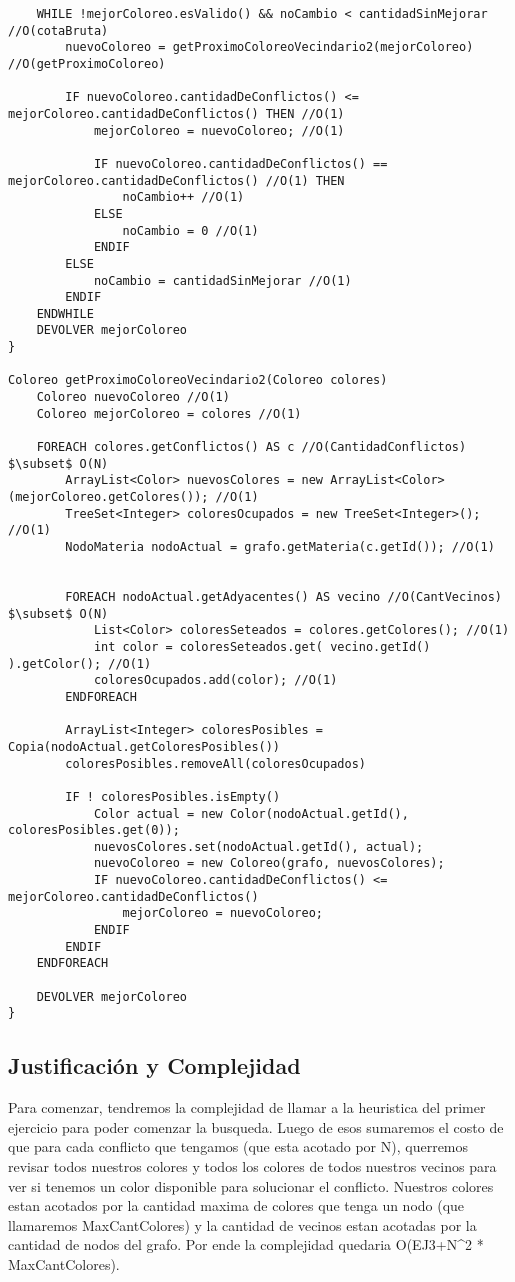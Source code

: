 \begin{verbatim}
    WHILE !mejorColoreo.esValido() && noCambio < cantidadSinMejorar //O(cotaBruta)
        nuevoColoreo = getProximoColoreoVecindario2(mejorColoreo) //O(getProximoColoreo)

        IF nuevoColoreo.cantidadDeConflictos() <= mejorColoreo.cantidadDeConflictos() THEN //O(1)
            mejorColoreo = nuevoColoreo; //O(1)

            IF nuevoColoreo.cantidadDeConflictos() == mejorColoreo.cantidadDeConflictos() //O(1) THEN
                noCambio++ //O(1)
            ELSE
                noCambio = 0 //O(1)
            ENDIF
        ELSE
            noCambio = cantidadSinMejorar //O(1)
        ENDIF
    ENDWHILE
    DEVOLVER mejorColoreo
}

Coloreo getProximoColoreoVecindario2(Coloreo colores)
    Coloreo nuevoColoreo //O(1)
    Coloreo mejorColoreo = colores //O(1)

    FOREACH colores.getConflictos() AS c //O(CantidadConflictos) $\subset$ O(N)
        ArrayList<Color> nuevosColores = new ArrayList<Color>(mejorColoreo.getColores()); //O(1)
        TreeSet<Integer> coloresOcupados = new TreeSet<Integer>(); //O(1)
        NodoMateria nodoActual = grafo.getMateria(c.getId()); //O(1)


        FOREACH nodoActual.getAdyacentes() AS vecino //O(CantVecinos) $\subset$ O(N)
            List<Color> coloresSeteados = colores.getColores(); //O(1)
            int color = coloresSeteados.get( vecino.getId() ).getColor(); //O(1)
            coloresOcupados.add(color); //O(1)
        ENDFOREACH

        ArrayList<Integer> coloresPosibles = Copia(nodoActual.getColoresPosibles())
        coloresPosibles.removeAll(coloresOcupados)

        IF ! coloresPosibles.isEmpty()
            Color actual = new Color(nodoActual.getId(), coloresPosibles.get(0));
            nuevosColores.set(nodoActual.getId(), actual);
            nuevoColoreo = new Coloreo(grafo, nuevosColores);
            IF nuevoColoreo.cantidadDeConflictos() <= mejorColoreo.cantidadDeConflictos()
                mejorColoreo = nuevoColoreo;
            ENDIF
        ENDIF
    ENDFOREACH

    DEVOLVER mejorColoreo
}

\end{verbatim}

\subsection{Justificaci\'on y Complejidad}
Para comenzar, tendremos la complejidad de llamar a la heuristica del primer ejercicio para poder comenzar la busqueda. Luego de esos sumaremos el costo de que para cada conflicto que tengamos (que esta acotado por N), querremos revisar todos nuestros colores y todos los colores de todos nuestros vecinos para ver si tenemos un color disponible para solucionar el conflicto. Nuestros colores estan acotados por la cantidad maxima de colores que tenga un nodo (que llamaremos MaxCantColores) y la cantidad de vecinos estan acotadas por la cantidad de nodos del grafo. Por ende la complejidad quedaria  O(EJ3+N^2 * MaxCantColores).\\

